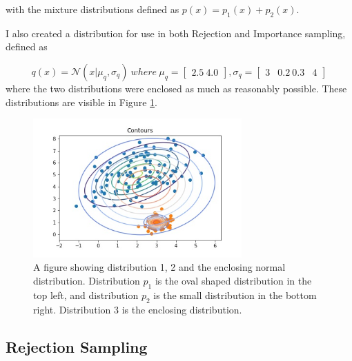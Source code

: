 \documentclass[a4paper, 11pt]{article}
\begin{document}
with the mixture distributions defined as $ p(x) = p_1(x) + p_2(x)$. 

I also created a distribution for use in both Rejection and Importance sampling, defined as 


\begin{equation}\label{eq:dist}
        q(x) = \mathcal{N}(x|\mu_q, \sigma_q) \: where \: \mu_q = \begin{bmatrix}2.5 \ 4.0\end{bmatrix}, \sigma_q = \begin{bmatrix}3 & 0.2 \ 0.3 & 4\end{bmatrix}
\end{equation}
where the two distributions were enclosed as much as reasonably possible. These distributions are visible in Figure \ref*{fig:distributions}.

\begin{figure}[h]
    \includegraphics[width=8cm]{fig/distributionsplotted.jpg}
    \caption{A figure showing distribution 1, 2 and the enclosing normal distribution. Distribution $p_1$ is the oval shaped distribution in the top left, and distribution $p_2$ is the small distribution in the bottom right. Distribution 3 is the enclosing distribution.}
    \label{fig:distributions}
\end{figure}

\subsection{Rejection Sampling}
\end{document}
